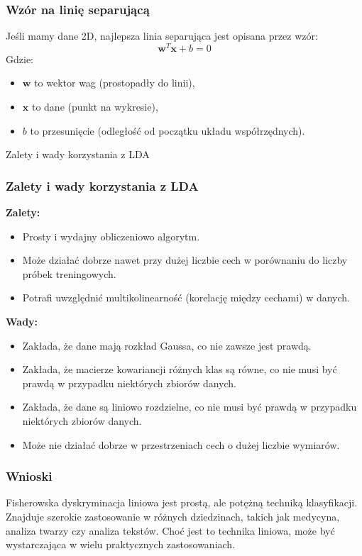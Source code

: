 \documentclass{beamer}
\begin{document}
\begin{frame}
    \frametitle{Wzór na linię separującą}
    Jeśli mamy dane 2D, najlepsza linia separująca jest opisana przez wzór:
    \[
    \mathbf{w}^T \mathbf{x} + b = 0
    \]
    Gdzie:
    \begin{itemize}
        \item \( \mathbf{w} \) to wektor wag (prostopadły do linii),
        \item \( \mathbf{x} \) to dane (punkt na wykresie),
        \item \( b \) to przesunięcie (odległość od początku układu współrzędnych).
    \end{itemize}
\end{frame}


\begin{frame}{Zalety i wady korzystania z LDA}
    \frametitle{Zalety i wady korzystania z LDA}
    
    \textbf{Zalety:}
    \begin{itemize}
        \item Prosty i wydajny obliczeniowo algorytm.
        \item Może działać dobrze nawet przy dużej liczbie cech w porównaniu do liczby próbek treningowych.
        \item Potrafi uwzględnić multikolinearność (korelację między cechami) w danych.
    \end{itemize}
    
    \bigskip
    
    \textbf{Wady:}
    \begin{itemize}
        \item Zakłada, że dane mają rozkład Gaussa, co nie zawsze jest prawdą.
        \item Zakłada, że macierze kowariancji różnych klas są równe, co nie musi być prawdą w przypadku niektórych zbiorów danych.
        \item Zakłada, że dane są liniowo rozdzielne, co nie musi być prawdą w przypadku niektórych zbiorów danych.
        \item Może nie działać dobrze w przestrzeniach cech o dużej liczbie wymiarów.
    \end{itemize}
\end{frame}


\begin{frame}
    \frametitle{Wnioski}
    Fisherowska dyskryminacja liniowa jest prostą, ale potężną techniką klasyfikacji. Znajduje szerokie zastosowanie w różnych dziedzinach, takich jak medycyna, analiza twarzy czy analiza tekstów. Choć jest to technika liniowa, może być wystarczająca w wielu praktycznych zastosowaniach.
\end{frame}
\end{document}
